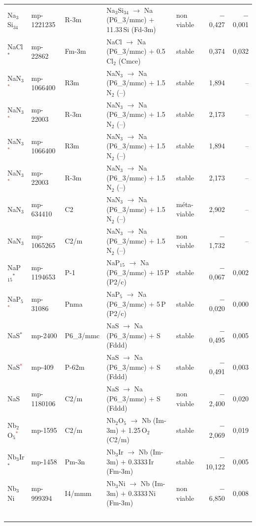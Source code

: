\begin{longtable}{@{}ll l@{\hspace{4pt}} p{4.6cm} l@{\hspace{4pt}} rr@{}}
Na$_{3}$Si$_{34}$ & mp-1221235 & R-3m & Na$_{3}$Si$_{34}$ $\to$ Na (P6\_3/mmc) $+$ 11.33\,Si (Fd-3m) & non viable & $-$0{,}427 & $-$0{,}001 \\
NaCl$^*$ & mp-22862 & Fm-3m & NaCl $\to$ Na (P6\_3/mmc) $+$ 0.5\,Cl$_{2}$ (Cmce) & stable & 0{,}374 & 0{,}032 \\
NaN$_{3}$\textcolor{red}{$^*$} & mp-1066400 & R3m & NaN$_{3}$ $\to$ Na (P6\_3/mmc) $+$ 1.5\,N$_{2}$ (--) & stable & 1{,}894 & -- \\
NaN$_{3}$\textcolor{red}{$^*$} & mp-22003 & R-3m & NaN$_{3}$ $\to$ Na (P6\_3/mmc) $+$ 1.5\,N$_{2}$ (--) & stable & 2{,}173 & -- \\
NaN$_{3}$\textcolor{red}{$^*$} & mp-1066400 & R3m & NaN$_{3}$ $\to$ Na (P6\_3/mmc) $+$ 1.5\,N$_{2}$ (--) & stable & 1{,}894 & -- \\
NaN$_{3}$\textcolor{red}{$^*$} & mp-22003 & R-3m & NaN$_{3}$ $\to$ Na (P6\_3/mmc) $+$ 1.5\,N$_{2}$ (--) & stable & 2{,}173 & -- \\
NaN$_{3}$ & mp-634410 & C2 & NaN$_{3}$ $\to$ Na (P6\_3/mmc) $+$ 1.5\,N$_{2}$ (--) & m\'eta-viable & 2{,}902 & -- \\
NaN$_{3}$ & mp-1065265 & C2/m & NaN$_{3}$ $\to$ Na (P6\_3/mmc) $+$ 1.5\,N$_{2}$ (--) & non viable & $-$1{,}732 & -- \\
NaP$_{15}$$^*$ & mp-1194653 & P-1 & NaP$_{15}$ $\to$ Na (P6\_3/mmc) $+$ 15\,P (P2/c) & stable & $-$0{,}067 & 0{,}002 \\
NaP$_{5}$\textcolor{red}{$^*$} & mp-31086 & Pnma & NaP$_{5}$ $\to$ Na (P6\_3/mmc) $+$ 5\,P (P2/c) & stable & $-$0{,}020 & 0{,}000 \\
NaS$^*$ & mp-2400 & P6\_3/mmc & NaS $\to$ Na (P6\_3/mmc) $+$ S (Fddd) & stable & $-$0{,}495 & 0{,}005 \\
NaS\textcolor{red}{$^*$} & mp-409 & P-62m & NaS $\to$ Na (P6\_3/mmc) $+$ S (Fddd) & stable & $-$0{,}491 & 0{,}003 \\
NaS & mp-1180106 & C2/m & NaS $\to$ Na (P6\_3/mmc) $+$ S (Fddd) & non viable & $-$2{,}400 & 0{,}020 \\
Nb$_{2}$O$_{5}$\textcolor{red}{$^*$} & mp-1595 & C2/m & Nb$_{2}$O$_{5}$ $\to$ Nb (Im-3m) $+$ 1.25\,O$_{2}$ (C2/m) & stable & $-$2{,}069 & 0{,}019 \\
Nb$_{3}$Ir$^*$ & mp-1458 & Pm-3n & Nb$_{3}$Ir $\to$ Nb (Im-3m) $+$ 0.3333\,Ir (Fm-3m) & stable & $-$10{,}122 & 0{,}005 \\
Nb$_{3}$Ni & mp-999394 & I4/mmm & Nb$_{3}$Ni $\to$ Nb (Im-3m) $+$ 0.3333\,Ni (Fm-3m) & non viable & $-$6{,}850 & 0{,}008 \\
$$
\end{longtable}
